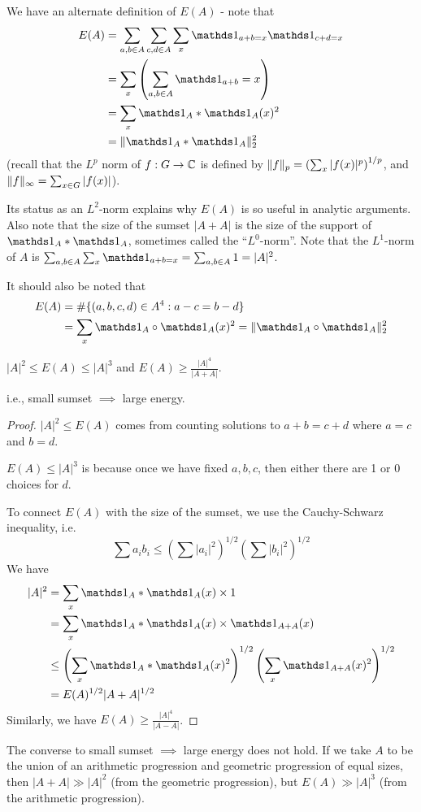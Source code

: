 \documentclass[10pt,a4paper]{article}
\begin{document}
We have an alternate definition of $E(A)$ - note that
\begin{align*}
  E(A) &= \sum_{a,b \in A} \sum_{c,d \in A} \sum_x \one_{a+b=x}\one_{c+d=x}\\
  &= \sum_x\left(\sum_{a,b\in A} \one_{a+b}=x\right)\\
  &= \sum_x \one_A \ast \one_A(x)^2\\
  &= \norm{\one_A \ast \one_A}_2^2
\end{align*}
(recall that the $L^p$ norm of $f:G \to \mathbb{C}$ is defined by $\lVert f\rVert_p = \left(\sum_x |f(x)|^p\right)^{1/p}$, and $\lVert f\rVert_\infty = \sum_{x\in G}|f(x)|$).

Its status as an $L^2$-norm explains why $E(A)$ is so useful in analytic arguments. Also note that the size of the sumset $|A+A|$ is the size of the support of $\one_A \ast \one_A$, sometimes called the ``$L^0$-norm''. Note that the $L^1$-norm of $A$ is $\sum_{a,b \in A}\sum_x \one_{a+b=x} = \sum_{a,b\in A} 1 = |A|^2$.

It should also be noted that
\begin{align*}
  E(A) &= \#\{(a,b,c,d) \in A^4 : a-c=b-d\}\\
  &= \sum_x \one_A \circ \one_A(x)^2 = \norm{\one_A\circ\one_A}_2^2
\end{align*}
\begin{lemma}
  $|A|^2 \leq E(A) \leq |A|^3$ and $E(A) \geq \frac{|A|^4}{|A+A|}$.
\end{lemma}
i.e., small sumset $\implies$ large energy.
\begin{proof}
  $|A|^2 \leq E(A)$ comes from counting solutions to $a+b=c+d$ where $a=c$ and $b=d$.

  $E(A)\leq |A|^3$ is because once we have fixed $a,b,c$, then either there are 1 or 0 choices for $d$.

  To connect $E(A)$ with the size of the sumset, we use the Cauchy-Schwarz inequality, i.e.
  \[\sum a_ib_i \leq \left(\sum|a_i|^2\right)^{1/2}\left(\sum |b_i|^2\right)^{1/2}\]
  We have
  \begin{align*}
    |A|^2 &= \sum_x \one_A\ast \one_A(x) \times 1\\
    &= \sum_x \one_A\ast \one_A(x) \times \one_{A+A}(x)\\
    &\leq \left(\sum_x \one_A \ast \one_A(x)^2\right)^{1/2}\left(\sum_x\one_{A+A}(x)^2\right)^{1/2}\\
    &= E(A)^{1/2}|A+A|^{1/2}
  \end{align*}
  Similarly, we have $E(A) \geq \frac{|A|^4}{|A-A|}$.
\end{proof}
The converse to small sumset $\implies$ large energy does not hold. If we take $A$ to be the union of an arithmetic progression and geometric progression of equal sizes, then $|A+A| \gg |A|^2$ (from the geometric progression), but $E(A) \gg |A|^3$ (from the arithmetic progression).
\end{document}

